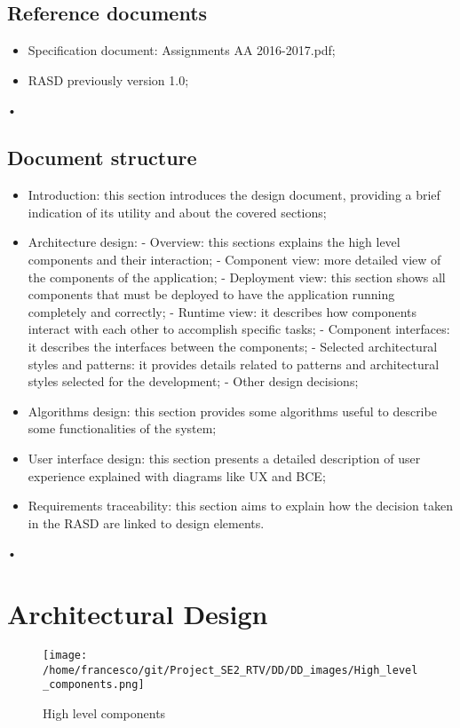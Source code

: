 \documentclass[10pt, a4paper,titlepage]{article}
\begin{document}
\subsection{Reference documents}
\begin{itemize}
\item Speciﬁcation document: Assignments AA 2016-2017.pdf;
\item RASD previously version 1.0;
\end{itemize}•
\subsection{Document structure}
\begin{itemize}
\item Introduction: this section introduces the design document, providing a brief indication of its utility and about the covered sections;
\item Architecture design:
\subitem - Overview: this sections explains the high level components and their interaction;
\subitem - Component view: more detailed view of the components of the application;
\subitem - Deployment view: this section shows all components that must be deployed to have the application running completely and correctly;
\subitem - Runtime view: it describes how components interact with each other to accomplish specific tasks;
\subitem - Component interfaces: it describes the interfaces between the components;
\subitem - Selected architectural styles and patterns: it provides details related to patterns and architectural styles selected for the development;
\subitem - Other design decisions;
\item Algorithms design: this section provides some algorithms useful to describe some functionalities of the system;
\item User interface design: this section presents a detailed description of user experience explained with diagrams like UX and BCE;
\item Requirements traceability: this section aims to explain how the decision taken in the RASD are linked to design elements.
\end{itemize}•
\newpage
\section{Architectural Design}
\begin{figure}
\texttt{[image: /home/francesco/git/Project\_SE2\_RTV/DD/DD\_images/High\_level\_components.png]}
\caption{High level components}
\label{fig:high_level_components}
\end{figure}
\end{document}

